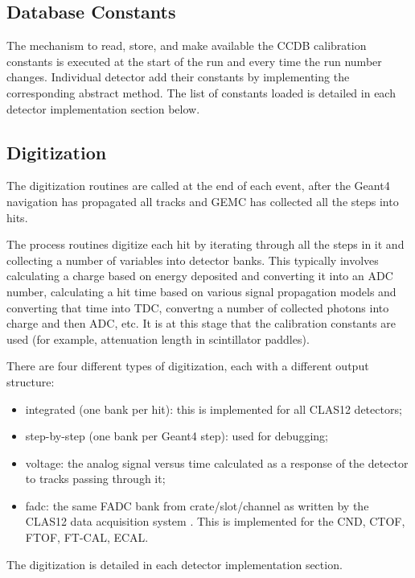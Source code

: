 \subsection{Database Constants}

The mechanism to read, store, and make available the CCDB \cite{ccdb} calibration constants is
executed at the start of the run and every time the run number changes.
Individual detector add their constants by implementing the corresponding abstract method.
The list of constants loaded is detailed in each detector implementation section below.

\subsection{Digitization}

The digitization routines are called at the end of each event, after the Geant4 navigation
has propagated all tracks and GEMC has collected all the steps into hits.

The process routines digitize each hit by iterating through all the steps in it and collecting
a number of variables into detector banks. This typically involves calculating a charge based
on energy deposited and converting it into an ADC number, calculating a hit time based
on various signal propagation models and converting that time into TDC, convertng a number
of collected photons into charge and then ADC, etc. It is at this stage that the calibration
constants are used (for example, attenuation length in scintillator paddles).

There are four different types of digitization, each with a different output structure:

\begin{itemize}
	\item integrated (one bank per hit): this is implemented for all CLAS12 detectors;
	\item step-by-step (one bank per Geant4 step): used for debugging;
	\item voltage: the analog signal versus time calculated as a response of the detector to tracks passing through it;
	\item fadc: the same FADC bank from crate/slot/channel as written by the CLAS12 data acquisition system \cite{daq-nim}.
          This is implemented for the CND, CTOF, FTOF, FT-CAL, ECAL.
\end{itemize}


The digitization is detailed in each detector implementation section.


